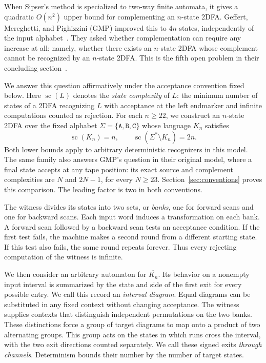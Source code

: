 \documentclass[11pt,a4paper]{article}
\theoremstyle{definition}
\theoremstyle{remark}
\newcommand{\statecomplexity}{\operatorname{sc}}
\begin{document}
When Sipser's method is specialized to two-way finite automata, it
gives a quadratic $O(n^2)$ upper bound for complementing an $n$-state
2DFA. Geffert, Mereghetti, and Pighizzini (GMP) improved this to $4n$
states, independently of the input alphabet~\cite{GMP}. They asked
whether complementation can require any increase at all: namely,
whether there exists an $n$-state 2DFA whose complement cannot be
recognized by an $n$-state 2DFA. This is the fifth open problem in
their concluding section~\cite[Section~6, p.~1186, problem~(e)]{GMP}.

We answer this question affirmatively under the acceptance convention
fixed below. Here $\statecomplexity(L)$ denotes the \emph{state complexity}
of $L$: the minimum number of states of a 2DFA recognizing $L$ with
acceptance at the left endmarker and infinite computations counted as
rejection. For each $n\ge22$, we construct an $n$-state 2DFA over
the fixed alphabet $\Sigma=\{\mathtt A,\mathtt B,\mathtt C\}$ whose
language $K_n$ satisfies
\[
 \statecomplexity(K_n)=n,\qquad \statecomplexity(\Sigma^*\setminus K_n)=2n.
\]
Both lower bounds apply to arbitrary deterministic recognizers in this
model.
The same family also answers GMP's question in their original model,
where a final state accepts at any tape position: its exact source
and complement complexities are $N$ and $2N-1$, for every $N\ge23$.
Section~\ref{sec:conventions} proves this comparison. The leading
factor is two in both conventions.

The witness divides its states into two sets, or \emph{banks}, one
for forward scans and one for backward scans. Each input word induces
a transformation on each bank. A forward scan followed by a backward
scan tests an acceptance condition. If the first test fails, the
machine makes a second round from a different starting state. If this
test also fails, the same round repeats forever. Thus every rejecting
computation of the witness is infinite.

We then consider an arbitrary automaton for $\overline{K_n}$. Its
behavior on a nonempty input interval is summarized by the state and
side of the first exit for every possible entry. We call this record
an \emph{interval diagram}. Equal diagrams can be substituted in any
fixed context without changing acceptance. The witness supplies
contexts that distinguish independent permutations on the two banks.
These distinctions force a group of target diagrams to map onto a
product of two alternating groups. This group acts on the states in
which runs cross the interval, with the two exit directions counted
separately. We call these signed exits \emph{through channels}.
Determinism bounds their number by the number of target states.
\end{document}

